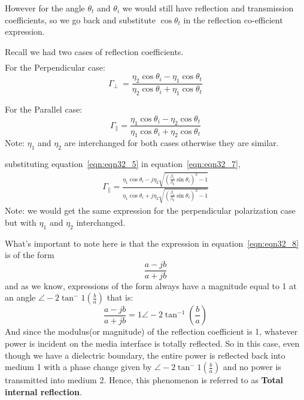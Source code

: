 However for the angle $\theta_t$ and $\theta_i$ we would still have reflection and transmission coefficients, so we go back and substitute $\cos\theta_t$ in the reflection co-efficient expression.

Recall we had two cases of reflection coefficients.
\begin{align*}
\end{align*}For the Perpendicular case:
\begin{equation}
\Gamma_\perp\ = \frac{\eta_2\cos\theta_i - \eta_1\cos\theta_t}{\eta_2\cos\theta_i + \eta_1\cos\theta_t}
\label{eqn:eqn32_6}
\end{equation}

For the Parallel case:
\begin{equation}
\Gamma_\parallel = \frac{\eta_1\cos\theta_i - \eta_2\cos\theta_t}{\eta_1\cos\theta_i + \eta_2\cos\theta_t}
\label{eqn:eqn32_7}
\end{equation}
Note: $\eta_1$ and $\eta_2$ are interchanged for both cases otherwise they are similar. 

substituting equation~\ref{eqn:eqn32_5} in equation~\ref{eqn:eqn32_7},
\begin{align}
\Gamma_\parallel = \frac{\eta_1\cos\theta_i - j\eta_2\sqrt{(\frac{\beta_1}{\beta_2}\sin\theta_i)^2-1}}{\eta_1\cos\theta_i + j\eta_2\sqrt{(\frac{\beta_1}{\beta_2}\sin\theta_i)^2-1}}
\label{eqn:eqn32_8}
\end{align}
Note: we would get the same expression for the perpendicular polarization case but with $\eta_1$ and $\eta_2$ interchanged. 

What's important to note here is that the expression in equation~\ref{eqn:eqn32_8} is of the form
\begin{equation}
\frac{a - j b}{a + j b}
\end{equation}
and as we know, expressions of the form always have a magnitude equal  to 1 at an angle $\angle-2\tan^-{1}(\frac{b}{a})$ that is:
\begin{equation}
\frac{a - j b}{a + j b} = 1\angle - 2\tan^{-1}(\frac{b}{a})
\end{equation} 
And since the modulus(or magnitude) of the reflection coefficient is 1, whatever power is incident on the media interface is totally reflected.
So in this case, even though we have a dielectric boundary, the entire power is reflected back into medium 1 with a phase change given by $\angle-2\tan^-{1}(\frac{b}{a})$ and no power is transmitted into medium 2. Hence, this phenomenon is referred to as \textbf{Total internal reflection}.

